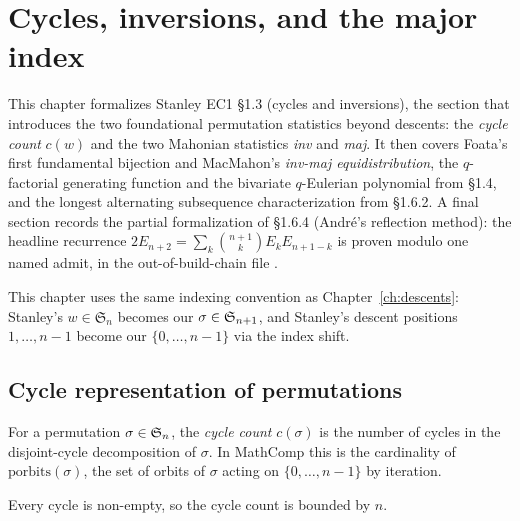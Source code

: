 \chapter{Cycles, inversions, and the major index}
\label{ch:inversions}

This chapter formalizes Stanley EC1 \S1.3 (cycles and inversions), the
section that introduces the two foundational permutation statistics
beyond descents: the \emph{cycle count} $c(w)$ and the two Mahonian
statistics \emph{inv} and \emph{maj}.  It then covers Foata's first
fundamental bijection and MacMahon's \emph{inv-maj equidistribution},
the $q$-factorial generating function and the bivariate $q$-Eulerian
polynomial from \S1.4, and the longest alternating subsequence
characterization from \S1.6.2.  A final section records the partial
formalization of \S1.6.4 (André's reflection method): the headline
recurrence
$2 E_{n+2} = \sum_k \binom{n+1}{k} E_k E_{n+1-k}$ is proven modulo
one named admit, in the out-of-build-chain file
.

\medskip
This chapter uses the same indexing convention as
Chapter~\ref{ch:descents}: Stanley's $w \in \mathfrak{S}_n$ becomes our
$\sigma \in \mathfrak{S}_{n+1}$, and Stanley's descent positions $1, \dots, n-1$
become our $\{0, \dots, n-1\}$ via the index shift.

\section{Cycle representation of permutations}

\begin{definition}
  \label{def:cycle_count}
  \rocqok
  For a permutation $\sigma \in \mathfrak{S}_{n}$, the \emph{cycle count}
  $c(\sigma)$ is the number of cycles in the disjoint-cycle
  decomposition of $\sigma$.  In MathComp this is the cardinality of
  $\mathrm{porbits}(\sigma)$, the set of orbits of $\sigma$ acting on
  $\{0, \dots, n-1\}$ by iteration.
\end{definition}

\begin{lemma}
  \label{lem:cycle_count_le}
  \rocqok
  Every cycle is non-empty, so the cycle count is bounded by $n$.
\end{lemma}

